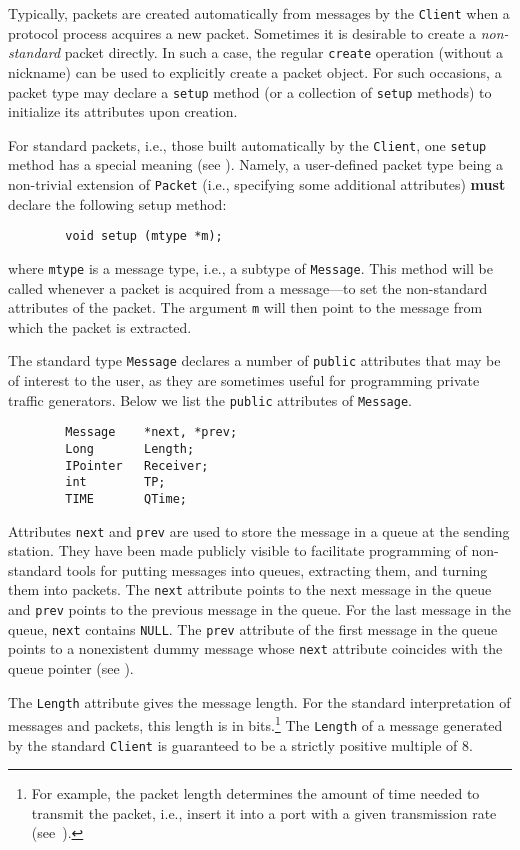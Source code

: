 \noindent
Typically, packets are created automatically from messages
by the {\tt Client} when a protocol process acquires a new packet.
Sometimes it is desirable to create a {\em non-standard\/} packet directly.
In such a case, the regular {\tt create} operation (without a nickname) can be
used to explicitly create a packet object.
For such occasions, a packet type may declare a
{\tt setup} method (or a collection of {\tt setup} methods)
to initialize its attributes upon creation.

For standard packets, i.e., those built automatically by the
{\tt Client}, one {\tt setup} method has a special meaning
(see ).
Namely,
a user-defined packet type being a non-trivial extension of
{\tt Packet} (i.e., specifying some additional attributes) {\bf must} declare
the following setup method:
\begin{verbatim}
        void setup (mtype *m);
\end{verbatim}
where {\tt mtype} is a message type, i.e., a subtype of {\tt Message}.
This method will be called whenever a packet is acquired from a message---to
set the non-standard attributes of the packet.
The argument {\tt m} will then point to the message from which the packet
is extracted.

The standard type {\tt Message} declares a number of {\tt public}
attributes that may be of interest to the user, as they are sometimes
useful for programming private traffic generators.
Below we list the {\tt public} attributes of {\tt Message}.
\begin{verbatim}
        Message    *next, *prev;
        Long       Length;
        IPointer   Receiver;
        int        TP;
        TIME       QTime;
\end{verbatim}

Attributes {\tt next} and {\tt prev} are used to store the message in a
queue at the sending station.
They have been made publicly visible to facilitate programming of non-standard
tools for putting messages into queues, extracting them, and turning them
into packets.
The {\tt next} attribute points to the next message in the queue and {\tt prev}
points to the previous message in the queue.
For the last message in the queue, {\tt next} contains {\tt NULL}.
The {\tt prev} attribute of the first message in the queue points to a
nonexistent
dummy message whose {\tt next} attribute coincides with the queue pointer
(see ).

The {\tt Length} attribute gives the message length.
For the standard interpretation of messages and packets, this length is in
bits.\footnote{For example, the packet length determines the amount of time
needed to transmit the packet, i.e., insert it into a port with a given
transmission rate (see~).}
The {\tt Length} of a message generated by the standard {\tt Client} is
guaranteed to be a strictly positive multiple of 8.

